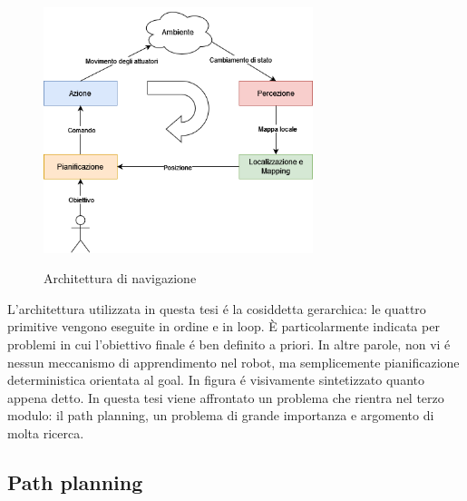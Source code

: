 \documentclass[14pt,a4paper]{extarticle}
\begin{document}
\begin{figure}[H]
\caption{Architettura di navigazione}
\centering
\includegraphics[width=0.7\textwidth]{architecture.png}
\label{arch}
\end{figure}

L'architettura utilizzata in questa tesi é la cosiddetta gerarchica: le quattro primitive vengono eseguite in ordine e in loop. È particolarmente indicata per problemi in cui l'obiettivo finale é ben definito a priori. In altre parole, non vi é nessun meccanismo di apprendimento nel robot, ma semplicemente pianificazione deterministica orientata al goal. In figura é visivamente sintetizzato quanto appena detto. In questa tesi viene affrontato un problema che rientra nel terzo modulo: il path planning, un problema di grande importanza e argomento di molta ricerca.

\subsection{Path planning}
\end{document}
